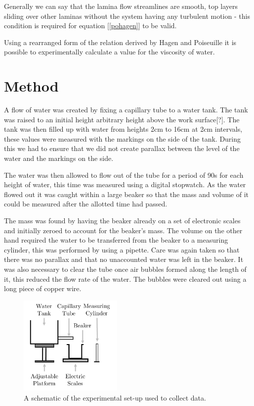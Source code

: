 \documentclass[twocolumn]{revtex4}
\begin{document}
Generally we can say that the lamina flow streamlines are smooth, top layers sliding over other laminas without the system having any turbulent motion - this condition is required for equation [\ref{pohagen}] to be valid. 

Using a rearranged form of the relation derived by Hagen and Poiseuille it is possible to experimentally calculate a value for the viscosity of water.

\vspace{-3ex}
\section{Method} 
\vspace{-2ex}
A flow of water was created by fixing a capillary tube to a water tank. The tank was raised to an initial height arbitrary height above the work surface[?]. The tank was then filled up with water from heights 2cm to 16cm at 2cm intervals, these values were measured with the markings on the side of the tank. During this we had to ensure that we did not create parallax between the level of the water and the markings on the side. 

The water was then allowed to flow out of the tube for a period of 90s for each height of water, this time was measured using a digital stopwatch. As the water flowed out it was caught within a large beaker so that the mass and volume of it could be measured after the allotted time had passed. 

The mass was found by having the beaker already on a set of electronic scales and initially zeroed to account for the beaker's mass. The volume on the other hand required the water to be transferred from the beaker to a measuring cylinder, this was performed by using a pipette. Care was again taken so that there was no parallax and that no unaccounted water was left in the beaker. It was also necessary to clear the tube once air bubbles formed along the length of it, this reduced the flow rate of the water. The bubbles were cleared out using a long piece of copper wire. 

\begin{figure}[!h]
\begin{center}
\includegraphics[width=5cm]{fig1}
\caption[]{A schematic of the experimental set-up used to collect data. }
\label{fig:fig1}
\end{center}
\end{figure}
\end{document}
